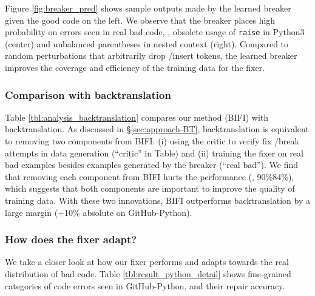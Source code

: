 Figure \ref{fig:breaker_pred} shows sample outputs made by the learned breaker  given the good code on the left. We observe that the breaker places high probability on errors seen in real bad code, \ie, obsolete usage of \texttt{raise} in Python3 (center) and unbalanced parentheses in nested context (right). Compared to random perturbations that arbitrarily drop \slash insert tokens, the learned breaker improves the coverage and efficiency of the training data for the fixer.




\subsubsection{Comparison with backtranslation} 
\label{sec:analysis-BT}

Table \ref{tbl:analysis_backtranslation} compares our method (BIFI) with backtranslation.
As discussed in \S \ref{sec:approach-BT}, backtranslation is equivalent to removing two components from BIFI: (i) using the critic to verify fix \slash break attempts in data generation (``critic'' in Table) and (ii) training the fixer on real bad examples besides examples generated by the breaker (``real bad''). We find that removing each component from BIFI hurts the performance (\eg, 90\%84\%), which suggests that both components are important to improve the quality of training data. With these two innovations, BIFI outperforms backtranslation by a large margin (+10\% absolute on GitHub-Python). 




\subsubsection{How does the fixer adapt?}
\label{sec:analysis-adapt}

We take a closer look at how our fixer performs and adapts towards the real distribution of bad code. Table \ref{tbl:result_python_detail} shows fine-grained categories of code errors seen in GitHub-Python, and their repair accuracy.

